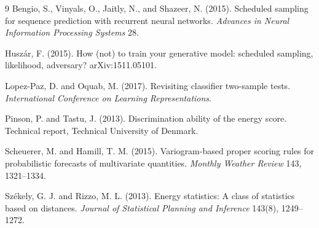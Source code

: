 \documentclass[11pt]{article}
\begin{document}
\begin{thebibliography}{9}
Bengio, S., Vinyals, O., Jaitly, N., and Shazeer, N. (2015).
Scheduled sampling for sequence prediction with recurrent neural networks.
\emph{Advances in Neural Information Processing Systems} 28.

Husz\'ar, F. (2015). How (not) to train your generative model: scheduled
sampling, likelihood, adversary? arXiv:1511.05101.

Lopez-Paz, D. and Oquab, M. (2017). Revisiting classifier two-sample tests.
\emph{International Conference on Learning Representations}.

Pinson, P. and Tastu, J. (2013). Discrimination ability of the energy score.
Technical report, Technical University of Denmark.

Scheuerer, M. and Hamill, T. M. (2015). Variogram-based proper scoring rules for
probabilistic forecasts of multivariate quantities. \emph{Monthly Weather
Review} 143, 1321--1334.

Sz\'ekely, G. J. and Rizzo, M. L. (2013). Energy statistics: A class of
statistics based on distances. \emph{Journal of Statistical Planning and
Inference} 143(8), 1249--1272.
\end{thebibliography}
\end{document}
